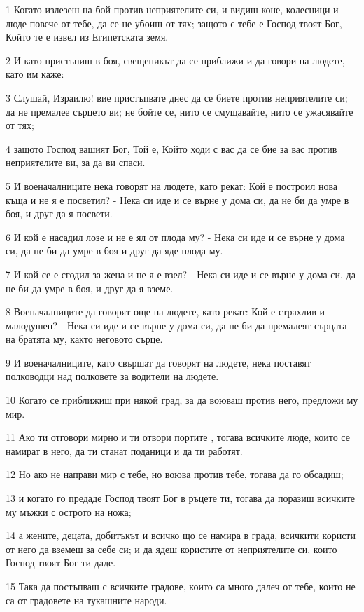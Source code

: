 \par 1 Когато излезеш на бой против неприятелите си, и видиш коне, колесници и люде повече от тебе, да се не убоиш от тях; защото с тебе е Господ твоят Бог, Който те е извел из Египетската земя.
\par 2 И като пристъпиш в боя, свещеникът да се приближи и да говори на людете, като им каже:
\par 3 Слушай, Израилю! вие пристъпвате днес да се биете против неприятелите си; да не премалее сърцето ви; не бойте се, нито се смущавайте, нито се ужасявайте от тях;
\par 4 защото Господ вашият Бог, Той е, Който ходи с вас да се бие за вас против неприятелите ви, за да ви спаси.
\par 5 И военачалниците нека говорят на людете, като рекат: Кой е построил нова къща и не я е посветил? - Нека си иде и се върне у дома си, да не би да умре в боя, и друг да я посвети.
\par 6 И кой е насадил лозе и не е ял от плода му? - Нека си иде и се върне у дома си, да не би да умре в боя и друг да яде плода му.
\par 7 И кой се е сгодил за жена и не я е взел? - Нека си иде и се върне у дома си, да не би да умре в боя, и друг да я вземе.
\par 8 Военачалниците да говорят още на людете, като рекат: Кой е страхлив и малодушен? - Нека си иде и се върне у дома си, да не би да премалеят сърцата на братята му, както неговото сърце.
\par 9 И военачалниците, като свършат да говорят на людете, нека поставят полководци над полковете за водители на людете.
\par 10 Когато се приближиш при някой град, за да воюваш против него, предложи му мир.
\par 11 Ако ти отговори мирно и ти отвори портите , тогава всичките люде, които се намират в него, да ти станат поданици и да ти работят.
\par 12 Но ако не направи мир с тебе, но воюва против тебе, тогава да го обсадиш;
\par 13 и когато го предаде Господ твоят Бог в ръцете ти, тогава да поразиш всичките му мъжки с острото на ножа;
\par 14 а жените, децата, добитъкът и всичко що се намира в града, всичкити користи от него да вземеш за себе си; и да ядеш користите от неприятелите си, които Господ твоят Бог ти даде.
\par 15 Така да постъпваш с всичките градове, които са много далеч от тебе, които не са от градовете на тукашните народи.
